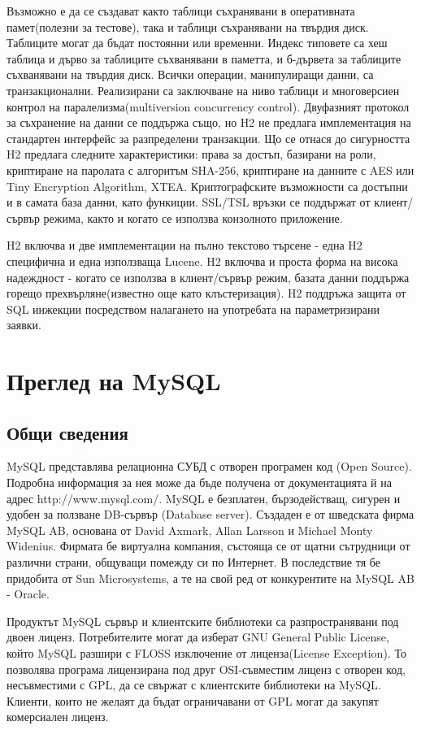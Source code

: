 Възможно е да се създават както таблици съхранявани в оперативната
памет(полезни за тестове), така и таблици съхранявани на твърдия
диск. Таблиците могат да бъдат постоянни или временни. Индекс типовете
са хеш таблица и дърво за таблиците съхванявани в паметта, и б-дървета
за таблиците съхванявани на твърдия диск. Всички операции,
манипулиращи данни, са транзакционални. Реализирани са заключване на
ниво таблици и многоверсиен контрол на паралелизма(multiversion
concurrency control). Двуфазният протокол за съхранение на данни се
поддържа също, но H2 не предлага имплементация на стандартен интерфейс
за разпределени транзакции. Що се отнася до сигурността H2 предлага
следните характеристики: права за достъп, базирани на роли, криптиране
на паролата с алгоритъм SHA-256, криптиране на данните с AES или Tiny
Encryption Algorithm, XTEA. Криптографските възможности са достъпни и
в самата база данни, като функиции. SSL/TSL връзки се поддържат от
клиент/сървър режима, както и когато се използва конзолното
приложение.

H2 включва и две имплементации на пълно текстово търсене - една H2
специфична и една използваща Lucene. H2 включва и проста форма на
висока надеждност - когато се използва в клиент/сървър режим, базата
данни поддържа горещо прехвърляне(известно още като клъстеризация). H2
поддръжа защита от SQL инжекции посредством налагането на употребата
на параметризирани заявки.  
\section{Преглед на MySQL}
\subsection{Общи сведения}
MySQL представлява релационна СУБД с отворен програмен код (Open
Source). Подробна информация за нея може да бъде получена от
документацията й на адрес http://www.mysql.com/. MySQL е безплатен,
бързодействащ, сигурен и удобен за ползване DB-сървър (Database
server). Създаден е от шведската фирма MySQL AB, основана от David
Axmark, Allan Larsson и Michael Monty Widenius. Фирмата бе виртуална
компания, състояща се от щатни сътрудници от различни страни, общуващи
помежду си по Интернет. В последствие тя бе придобита от Sun
Microsystems, а те на свой ред от конкурентите на MySQL AB - Oracle.

Продуктът MySQL сървър и клиентските библиотеки са разпространявани
под двоен лиценз. Потребителите могат да изберат GNU General Public
License, който MySQL разшири с FLOSS изключение от лиценза(License
Exception). То позволява програма лицензирана под друг OSI-съвместим
лиценз с отворен код, несъвместими с GPL, да се свържат с клиентските
библиотеки на MySQL. Клиенти, които не желаят да бъдат
ограничавани от GPL могат да закупят комерсиален лиценз.

